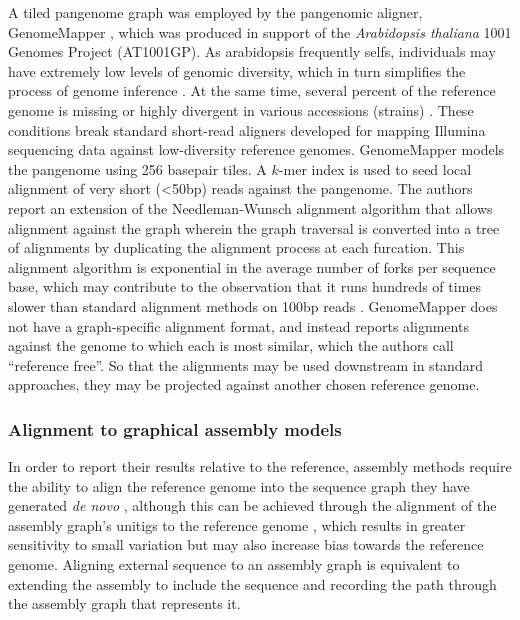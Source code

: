 \documentclass[a4paper,12pt,numbered,oneside]{Classes/PhDThesisPSnPDF}
\begin{document}
A tiled pangenome graph was employed by the pangenomic aligner, GenomeMapper \cite{schneeberger2009simultaneous}, which was produced in support of the \emph{Arabidopsis thaliana} 1001 Genomes Project (AT1001GP).
As arabidopsis frequently selfs, individuals may have extremely low levels of genomic diversity, which in turn simplifies the process of genome inference \cite{cao2011whole}.
At the same time, several percent of the reference genome is missing or highly divergent in various accessions (strains) \cite{clark2007common,zeller2008detecting}.
These conditions break standard short-read aligners developed for mapping Illumina sequencing data against low-diversity reference genomes.
GenomeMapper models the pangenome using 256 basepair tiles.
A $k$-mer index is used to seed local alignment of very short (<50bp) reads against the pangenome.
The authors report an extension of the Needleman-Wunsch alignment algorithm that allows alignment against the graph wherein the graph traversal is converted into a tree of alignments by duplicating the alignment process at each furcation.
This alignment algorithm is exponential in the average number of forks per sequence base, which may contribute to the observation that it runs hundreds of times slower than standard alignment methods on 100bp reads \cite{liu2016debga}.
GenomeMapper does not have a graph-specific alignment format, and instead reports alignments against the genome to which each is most similar, which the authors call ``reference free''.
So that the alignments may be used downstream in standard approaches, they may be projected against another chosen reference genome.

\subsubsection{Alignment to graphical assembly models}

In order to report their results relative to the reference, assembly methods require the ability to align the reference genome into the sequence graph they have generated \emph{de novo} \cite{iqbal2012novo,simpson2012efficient}, although this can be achieved through the alignment of the assembly graph's unitigs to the reference genome \cite{li2015fermikit}, which results in greater sensitivity to small variation but may also increase bias towards the reference genome.
Aligning external sequence to an assembly graph is equivalent to extending the assembly to include the sequence and recording the path through the assembly graph that represents it.
\end{document}
